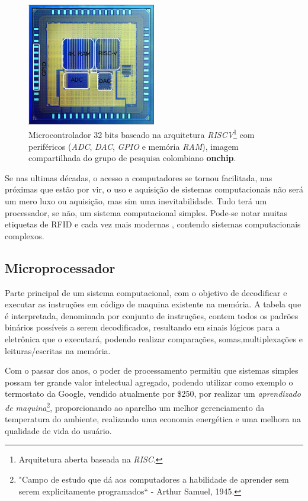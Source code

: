 \begin{figure}[!htb]
  \centering
  \caption[Microcontrolador na pastilha de silício.]{Microcontrolador 32 bits baseado na arquitetura \textit{RISCV}\footnote{Arquitetura aberta baseada na \textit{RISC}.}
  com periféricos (\textit{ADC}, \textit{DAC}, \textit{GPIO} e memória \textit{RAM}), imagem compartilhada do grupo de pesquisa
  colombiano \textbf{onchip}.}
  \label{fig:ricv}
  \includegraphics[width=0.5\textwidth]{figuras/riscv.jpg}
\end{figure}


Se nas ultimas décadas, o acesso a computadores se tornou facilitada, nas próximas que estão por vir, o uso e aquisição de sistemas computacionais não será um mero luxo ou aquisição, mas sim uma inevitabilidade. Tudo terá um processador, se não, um sistema computacional simples. Pode-se notar muitas etiquetas de RFID e cada vez mais modernas \cite{ricci2008design}, contendo sistemas computacionais complexos.

\subsection{Microprocessador}

Parte principal de um sistema computacional, com o objetivo de decodificar e executar as instruções em código de maquina existente na memória. A tabela que é interpretada, denominada por conjunto de instruções, contem todos os padrões binários possíveis a serem decodificados, resultando em sinais lógicos para a eletrônica que o executará, podendo realizar comparações, somas,multiplexações e leituras/escritas na memória.

Com o passar dos anos, o poder de processamento permitiu que sistemas simples possam ter grande valor intelectual agregado, podendo utilizar como exemplo o termostato da Google, vendido atualmente por \$250, por realizar um \textit{aprendizado de maquina}\footnote{"Campo de estudo que dá aos computadores a habilidade de aprender sem serem explicitamente programados`` -  Arthur Samuel, 1945.}, proporcionando ao aparelho um melhor gerenciamento da temperatura do ambiente, realizando uma economia energética e uma melhora na qualidade de vida do usuário.

